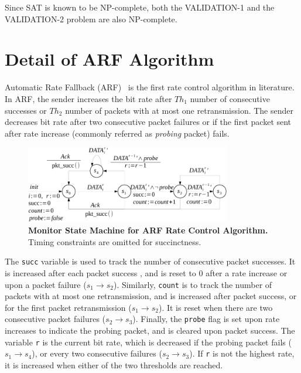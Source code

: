 Since SAT is known to be NP-complete, both the VALIDATION-1 and the
VALIDATION-2 problem are also NP-complete.

\section{Detail of ARF Algorithm}
Automatic Rate Fallback (ARF)~\cite{kamerman1997wavelan} is the first rate
control algorithm in literature. In ARF, the sender increases the bit rate after
$Th_1$ number of consecutive successes or $Th_2$ number of packets with at most
one retransmission. The sender decreases bit rate after two consecutive packet
failures or if the first packet sent after rate increase (commonly referred as
\textit{probing} packet) fails.


\begin{figure}[h!]
  \centering
  \includegraphics[width=0.8\textwidth]{./figures/arf_sm.pdf}
  \caption{\textbf{Monitor State Machine for ARF Rate Control Algorithm.} Timing
  constraints are omitted for succinctness.}
  \label{fig:arf_sm}
\end{figure}


The \texttt{succ} variable is used to track the number of consecutive packet
successes. It is increased after each packet success , and is reset to 0 after a
rate increase or upon a packet failure ($s_1\rightarrow s_2$).  Similarly,
\texttt{count} is to track the number of packets with at most one
retransmission, and is increased after packet success, or for the first packet
retransmission ($s_1\rightarrow s_2$). It is reset when there are two
consecutive packet failures ($s_2\rightarrow s_3$). Finally, the \texttt{probe}
flag is set upon rate increases to indicate the probing packet, and is cleared
upon packet success. The variable \texttt{r} is the current bit rate, which is
decreased if the probing packet fails ($s_1\rightarrow s_4$), or every two
consecutive failures ($s_2\rightarrow s_3$). If \texttt{r} is not the highest
rate, it is increased when either of the two thresholds are reached.


